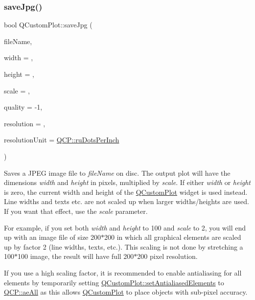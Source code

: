 \subsubsection{\texorpdfstring{save\+Jpg()}{saveJpg()}}
{\footnotesize\ttfamily bool Q\+Custom\+Plot\+::save\+Jpg (\begin{DoxyParamCaption}\item[{const Q\+String \&}]{file\+Name,  }\item[{int}]{width = {},  }\item[{int}]{height = {},  }\item[{double}]{scale = {},  }\item[{int}]{quality = {\ttfamily -\/1},  }\item[{int}]{resolution = {},  }\item[{\mbox{\hyperlink{namespace_q_c_p_a715d46153da230990aa887d0f0602452}{Q\+C\+P\+::\+Resolution\+Unit}}}]{resolution\+Unit = {\ttfamily \mbox{\hyperlink{namespace_q_c_p_a715d46153da230990aa887d0f0602452affb887d8efe79c39a1aca2acd7002afc}{Q\+C\+P\+::ru\+Dots\+Per\+Inch}}} }\end{DoxyParamCaption})}

Saves a J\+P\+EG image file to {\itshape file\+Name} on disc. The output plot will have the dimensions {\itshape width} and {\itshape height} in pixels, multiplied by {\itshape scale}. If either {\itshape width} or {\itshape height} is zero, the current width and height of the \mbox{\hyperlink{class_q_custom_plot}{Q\+Custom\+Plot}} widget is used instead. Line widths and texts etc. are not scaled up when larger widths/heights are used. If you want that effect, use the {\itshape scale} parameter.

For example, if you set both {\itshape width} and {\itshape height} to 100 and {\itshape scale} to 2, you will end up with an image file of size 200$\ast$200 in which all graphical elements are scaled up by factor 2 (line widths, texts, etc.). This scaling is not done by stretching a 100$\ast$100 image, the result will have full 200$\ast$200 pixel resolution.

If you use a high scaling factor, it is recommended to enable antialiasing for all elements by temporarily setting \mbox{\hyperlink{class_q_custom_plot_af6f91e5eab1be85f67c556e98c3745e8}{Q\+Custom\+Plot\+::set\+Antialiased\+Elements}} to \mbox{\hyperlink{namespace_q_c_p_ae55dbe315d41fe80f29ba88100843a0caa897c232a0ffc8368e7c100ffc59ef31}{Q\+C\+P\+::ae\+All}} as this allows \mbox{\hyperlink{class_q_custom_plot}{Q\+Custom\+Plot}} to place objects with sub-\/pixel accuracy.


